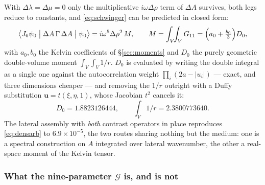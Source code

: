 \documentclass[11pt,a4paper]{article}
\begin{document}
With $\Delta\lambda = \Delta\mu = 0$ only the multiplicative $i\omega\Delta\rho$
term of $\Delta A$ survives, both legs reduce to constants, and
\eqref{eq:schwinger} can be predicted in closed form:
\begin{equation}\label{eq:densarb}
  \bigl\langle J_6\psi_0 \bigm| \Delta A\,\Gamma\,\Delta A \bigm| \psi_0\bigr\rangle
  = i\omega^5 \Delta\rho^2\, M,
  \qquad
  M = \int_V\!\!\int_V G_{11} = \Bigl(a_0 + \tfrac{b_0}{3}\Bigr) D_0 ,
\end{equation}
with $a_0, b_0$ the Kelvin coefficients of \S\ref{sec:moments} and $D_0$ the
purely geometric double-volume moment $\int_V\!\int_V 1/r$.  $D_0$ is evaluated
by writing the double integral as a single one against the autocorrelation
weight $\prod_i(2a - |u_i|)$ --- exact, and three dimensions cheaper --- and
removing the $1/r$ outright with a Duffy substitution
$\mathbf{u} = t(\xi,\eta,1)$, whose Jacobian $t^2$ cancels it:
\begin{equation}
  D_0 = 1.8823126444 ,\qquad
  \int_V 1/r = 2.3800773640 .
\end{equation}
The lateral assembly with \emph{both} contrast operators in place reproduces
\eqref{eq:densarb} to $6.9\times10^{-5}$, the two routes sharing nothing but the
medium: one is a spectral construction on $A$ integrated over lateral
wavenumber, the other a real-space moment of the Kelvin tensor.

\subsubsection*{What the nine-parameter $\mathcal{G}$ is, and is not}
\end{document}
